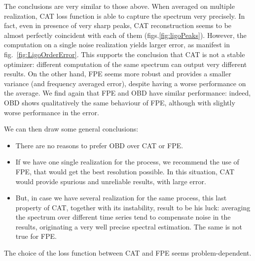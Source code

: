\documentclass[twocolumn,showpacs,preprintnumbers,nofootinbib,prd,
superscriptaddress,10pt]{revtex4-1}
\begin{document}
The conclusions are very similar to those above. When averaged on multiple realization, CAT loss function is able to capture the spectrum very precisely.
In fact, even in presence of very sharp peaks, CAT reconstruction seems to be almost perfectly coincident with each of them (figs.\ref{fig:ligoPeaks}).
However, the computation on a single noise realization yields larger error, as manifest in fig.~\ref{fig:LigoOrderError}.
This supports the conclusion that CAT is not a stable optimizer: different computation of the same spectrum can output very different results.
On the other hand, FPE seems more robust and provides a smaller variance (and frequency averaged error), despite having a worse performance on the average.
We find again that FPE and OBD have similar performance: indeed, OBD shows qualitatively the same behaviour of FPE, although with slightly worse performance in the error.

We can then draw some general conclusions:
\begin{itemize}
	\item There are no reasons to prefer OBD over CAT or FPE.
	\item If we have one single realization for the process, we recommend the use of FPE, that would get the best resolution possible. In this situation, CAT would provide spurious and unreliable results, with large error.
	\item But, in case we have several realization for the same process, this last property of CAT, together with its instability, result to be his luck: averaging the spectrum over different time series tend to compensate noise in the results, originating a very well precise spectral estimation. The same is not true for FPE.
\end{itemize}

The choice of the loss function between CAT and FPE seems problem-dependent.
\end{document}
